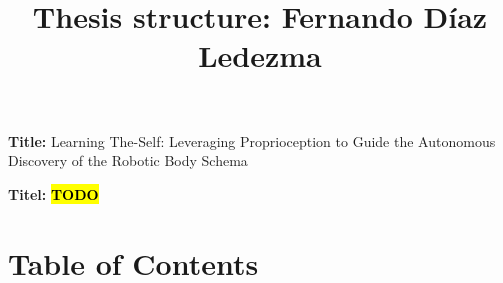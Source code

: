 \documentclass[12pt, a4paper]{article}
\title{Thesis structure: Fernando Díaz Ledezma}
\author{}
\date{}
\newcommand{\namelistlabel}[1]{\mbox{#1}	\hfil}
\newcommand{\TODO}{\hl{\textbf{TODO}}}
\newenvironment{namelist}[1]{%
\begin{list}{}
    {
        \let\makelabel\namelistlabel
        \settowidth{\labelwidth}{#1}
        \setlength{\leftmargin}{1.1\labelwidth}
    }
  }{%
\end{list}}
\begin{document}
\maketitle

\begin{namelist}{xxxxxxxxxxxx}
\item[{\bf Title:}]
	Learning The-Self: Leveraging Proprioception to Guide the Autonomous Discovery of the Robotic Body Schema

\item[{\bf Titel:}]
\TODO
\end{namelist}

\section*{Table of Contents}
\end{document}
